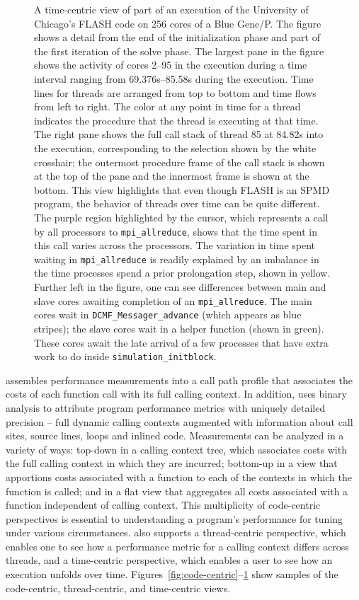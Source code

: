 \documentclass[11pt,letterpaper]{report}
\begin{document}
\begin{figure}[t]
\caption{A time-centric view of  part of an execution of the University of Chicago's FLASH code  on 256 cores of a Blue Gene/P. The figure shows a detail from the end of the initialization phase and  part of the first iteration of the solve phase. The largest pane in the figure shows the activity of cores 2--95 in the execution during a time interval ranging from 69.376s--85.58s during the execution.  Time lines for threads are arranged from top to bottom and time flows from left to right. The color at any point in time for a thread indicates the procedure that the thread is executing at that time. The right pane shows the full call stack of thread 85 at 84.82s into the execution, corresponding to the selection shown by the white crosshair; the outermost procedure frame of the call stack is shown at the top of the pane and the innermost frame is shown at the bottom. This view highlights that even though FLASH is an SPMD program, the behavior of threads over time can be quite different. The purple region highlighted by the cursor, which represents a call by all processors to {\tt mpi\_allreduce}, shows that the time spent in this call varies across the processors. The variation in time spent waiting in {\tt mpi\_allreduce} is readily explained by an imbalance in the time processes spend a prior prolongation step, shown in yellow. Further left in the figure, one can see differences between main and slave cores  awaiting completion of an {\tt mpi\_allreduce}. The main cores wait in {\tt DCMF\_Messager\_advance} (which appears as blue stripes); the slave cores wait in a helper function (shown in green). These cores await the late arrival of a few processes that have extra work to do inside {\tt simulation\_initblock}.}
\label{fig:time-centric}
\end{figure}



\HPCToolkit{} assembles performance measurements into a call path profile that associates the costs of each function call with its full calling context.
In addition, \HPCToolkit{} uses binary analysis to attribute program performance metrics with uniquely detailed precision -- full dynamic calling contexts augmented with information about call sites, source lines, loops and inlined code.
Measurements can be analyzed in a variety of ways: top-down in a calling context tree, which associates costs with the full calling context in which they are incurred; bottom-up in a view that apportions costs associated with a function to each of the contexts in which the function is called; and in a flat view that aggregates all costs associated with a function independent of calling context.
This multiplicity of code-centric perspectives is essential to understanding a program's performance for tuning under various circumstances. \HPCToolkit{} also supports a thread-centric perspective, which enables one to see how a performance metric for a calling context differs across threads, and a time-centric perspective, which enables a user to see how an execution unfolds over time. Figures~\ref{fig:code-centric}--\ref{fig:time-centric} show samples of the code-centric, thread-centric, and time-centric views.
\end{document}
